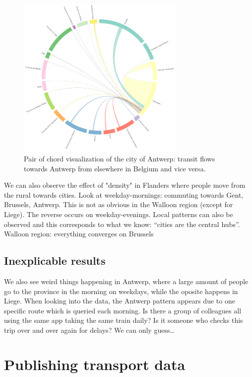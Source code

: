 \documentclass{sig-alternate}
\begin{document}
\begin{figure}
\centering
\includegraphics[width=8.1cm]{antwerp}
\caption{Pair of chord visualization of the city of Antwerp: transit flows towards Antwerp from elsewhere in Belgium and vice versa.}
\label{fig:antwerp}
\end{figure}

We can also observe the effect of "density" in Flanders where people move from the rural towards cities. Look at weekday-mornings: commuting towards Gent, Brussels, Antwerp. This is not as obvious in the Walloon region (except for Liege). The reverse occurs on weekday-evenings. Local patterns can also be observed and this corresponds to what we know: ``cities are the central hubs''.
Walloon region: everything converges on Brussels

\subsection{Inexplicable results}

We also see weird things happening in Antwerp, where a large amount of people go to the province in the morning on weekdays, while the oposite happens in Liege.
When looking into the data, the Antwerp pattern appears due to one specific route which is queried each morning.
Is there a group of colleagues all using the same app taking the same train daily?
Is it someone who checks this trip over and over again for delays?
We can only guess\ldots

\section{Publishing transport data}
\label{sec:publishing}

\end{document}
